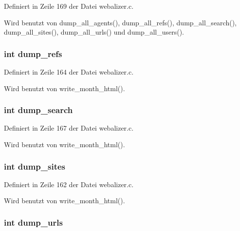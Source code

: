 Definiert in Zeile 169 der Datei webalizer.c.

Wird benutzt von dump\_\-all\_\-agents(), dump\_\-all\_\-refs(), dump\_\-all\_\-search(), dump\_\-all\_\-sites(), dump\_\-all\_\-urls() und dump\_\-all\_\-users().
\subsubsection{\setlength{\rightskip}{0pt plus 5cm}int {\bf dump\_\-refs}}\label{webalizer_8h_5e125d6b90581ab008f71bf272ec1aac}




Definiert in Zeile 164 der Datei webalizer.c.

Wird benutzt von write\_\-month\_\-html().
\subsubsection{\setlength{\rightskip}{0pt plus 5cm}int {\bf dump\_\-search}}\label{webalizer_8h_5acb64968750f92b0c7443ec44dde282}




Definiert in Zeile 167 der Datei webalizer.c.

Wird benutzt von write\_\-month\_\-html().
\subsubsection{\setlength{\rightskip}{0pt plus 5cm}int {\bf dump\_\-sites}}\label{webalizer_8h_54401b9d6a97a9951e2fb1bf09e83b2b}




Definiert in Zeile 162 der Datei webalizer.c.

Wird benutzt von write\_\-month\_\-html().
\subsubsection{\setlength{\rightskip}{0pt plus 5cm}int {\bf dump\_\-urls}}\label{webalizer_8h_a9f638a5b7e03638423ce8d5c3f5be6e}




